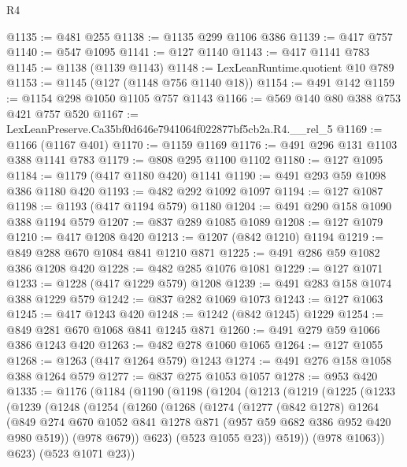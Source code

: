 \begin{lexlean}{R4}
\begin{coremodule}
@1135 := @481 @255
@1138 := @1135 @299 @1106 @386
@1139 := @417 @757
@1140 := @547 @1095
@1141 := @127 @1140
@1143 := @417 @1141 @783
@1145 := @1138 (@1139 @1143)
@1148 := LexLeanRuntime.quotient @10 @789
@1153 := @1145 (@127 (@1148 @756 @1140 @18))
@1154 := @491 @142
@1159 := @1154 @298 @1050 @1105 @757 @1143
@1166 := @569 @140 @80 @388 @753 @421 @757 @520
@1167 := LexLeanPreserve.Ca35bf0d646e7941064f022877bf5cb2a.R4.__rel_5
@1169 := @1166 (@1167 @401)
@1170 := @1159 @1169
@1176 := @491 @296 @131 @1103 @388 @1141 @783
@1179 := @808 @295 @1100 @1102
@1180 := @127 @1095
@1184 := @1179 (@417 @1180 @420) @1141
@1190 := @491 @293 @59 @1098 @386 @1180 @420
@1193 := @482 @292 @1092 @1097
@1194 := @127 @1087
@1198 := @1193 (@417 @1194 @579) @1180
@1204 := @491 @290 @158 @1090 @388 @1194 @579
@1207 := @837 @289 @1085 @1089
@1208 := @127 @1079
@1210 := @417 @1208 @420
@1213 := @1207 (@842 @1210) @1194
@1219 := @849 @288 @670 @1084 @841 @1210 @871
@1225 := @491 @286 @59 @1082 @386 @1208 @420
@1228 := @482 @285 @1076 @1081
@1229 := @127 @1071
@1233 := @1228 (@417 @1229 @579) @1208
@1239 := @491 @283 @158 @1074 @388 @1229 @579
@1242 := @837 @282 @1069 @1073
@1243 := @127 @1063
@1245 := @417 @1243 @420
@1248 := @1242 (@842 @1245) @1229
@1254 := @849 @281 @670 @1068 @841 @1245 @871
@1260 := @491 @279 @59 @1066 @386 @1243 @420
@1263 := @482 @278 @1060 @1065
@1264 := @127 @1055
@1268 := @1263 (@417 @1264 @579) @1243
@1274 := @491 @276 @158 @1058 @388 @1264 @579
@1277 := @837 @275 @1053 @1057
@1278 := @953 @420
@1335 := @1176
    (@1184
      (@1190
        (@1198
          (@1204
            (@1213
              (@1219
                (@1225
                  (@1233
                    (@1239
                      (@1248
                        (@1254
                          (@1260
                            (@1268
                              (@1274
                                (@1277
                                  (@842 @1278)
                                  @1264
                                  (@849
                                    @274
                                    @670
                                    @1052
                                    @841
                                    @1278
                                    @871
                                    (@957 @59 @682 @386 @952 @420 @980 @519))
                                  (@978 @679))
                                @623)
                              (@523 @1055 @23))
                            @519))
                        (@978 @1063))
                      @623)
                    (@523 @1071 @23))

\end{coremodule}
\end{lexlean}
